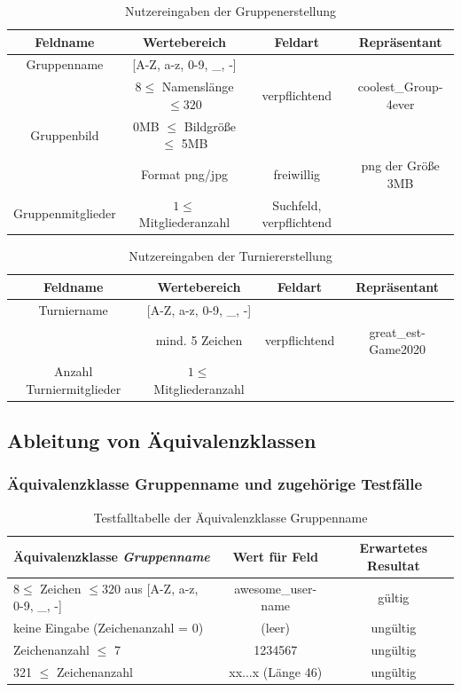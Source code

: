 		\begin{table}[H]
			\centering
			\begin{tabular}{c|c|c|c}
				\textbf{Feldname}&\textbf{Wertebereich} & \textbf{Feldart} & \textbf{Repräsentant}  \\  
				\hline
				Gruppenname  			& [A-Z, a-z, 0-9, \_, -] 				& &\\ 
										& \(8 \leq \) Namenslänge \(\leq 320\) 	&verpflichtend &coolest\_Group-4ever\\ \hline 
				Gruppenbild				& 0MB \(\leq\) Bildgröße \(\leq\) 5MB	&&\\  
										& Format png/jpg						&freiwillig&png der Größe 3MB\\ \hline
				Gruppenmitglieder		& \(1 \leq \) Mitgliederanzahl			&Suchfeld, verpflichtend&\\

			\end{tabular}
			\caption{Nutzereingaben der Gruppenerstellung}
		\end{table}
		\noindent
		
				\begin{table}[H]
			\centering
			\begin{tabular}{c|c|c|c}
				\textbf{Feldname}&\textbf{Wertebereich} & \textbf{Feldart} & \textbf{Repräsentant}  \\  
				\hline
				Turniername  			& [A-Z, a-z, 0-9, \_, -] 	&&\\ 
										& mind. 5 Zeichen 			&verpflichtend& great\_est-Game2020\\ \hline 
				Anzahl Turniermitglieder&  \(1 \leq \) Mitgliederanzahl	&&\\
				
			\end{tabular}
			\caption{Nutzereingaben der Turniererstellung}
		\end{table}
		\noindent

	\subsection{Ableitung von Äquivalenzklassen}
		\subsubsection{Äquivalenzklasse Gruppenname und zugehörige Testfälle}
		\begin{table}[H]
		\centering
		\begin{tabular}{l|c|c}
			\textbf{Äquivalenzklasse \textit{Gruppenname}} &\textbf{Wert für Feld}  &\textbf {Erwartetes Resultat} \\  
			\hline
			 \(8 \leq \) Zeichen \(\leq 320\) aus [A-Z, a-z, 0-9, \_, -]  & awesome\_user-name &gültig  \\  
			keine Eingabe (Zeichenanzahl = 0)&(leer)  & ungültig \\  
			Zeichenanzahl \(\leq\) 7 & 1234567 & ungültig \\  
			321 \(\leq\) Zeichenanzahl  & xx...x (Länge 46) &ungültig  \\  
		\end{tabular}
		\caption{Testfalltabelle der Äquivalenzklasse Gruppenname}
		\end{table}
	\noindent
